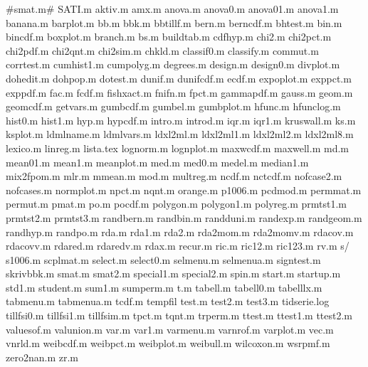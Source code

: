 #smat.m#
SATI.m
aktiv.m
amx.m
anova.m
anova0.m
anova01.m
anova1.m
banana.m
barplot.m
bb.m
bbk.m
bbtillf.m
bern.m
berncdf.m
bhtest.m
bin.m
bincdf.m
boxplot.m
branch.m
bs.m
buildtab.m
cdfhyp.m
chi2.m
chi2pct.m
chi2pdf.m
chi2qnt.m
chi2sim.m
chkld.m
classif0.m
classify.m
commut.m
corrtest.m
cumhist1.m
cumpolyg.m
degrees.m
design.m
design0.m
divplot.m
dohedit.m
dohpop.m
dotest.m
dunif.m
dunifcdf.m
ecdf.m
expoplot.m
exppct.m
exppdf.m
fac.m
fcdf.m
fishxact.m
fnifn.m
fpct.m
gammapdf.m
gauss.m
geom.m
geomcdf.m
getvars.m
gumbcdf.m
gumbel.m
gumbplot.m
hfunc.m
hfunclog.m
hist0.m
hist1.m
hyp.m
hypcdf.m
intro.m
introd.m
iqr.m
iqr1.m
kruswall.m
ks.m
ksplot.m
ldmlname.m
ldmlvars.m
ldxl2ml.m
ldxl2ml1.m
ldxl2ml2.m
ldxl2ml8.m
lexico.m
linreg.m
lista.tex
lognorm.m
lognplot.m
maxwcdf.m
maxwell.m
md.m
mean01.m
mean1.m
meanplot.m
med.m
med0.m
medel.m
median1.m
mix2fpom.m
mlr.m
mmean.m
mod.m
multreg.m
ncdf.m
nctcdf.m
nofcase2.m
nofcases.m
normplot.m
npct.m
nqnt.m
orange.m
p1006.m
pcdmod.m
permmat.m
permut.m
pmat.m
po.m
pocdf.m
polygon.m
polygon1.m
polyreg.m
prmtst1.m
prmtst2.m
prmtst3.m
randbern.m
randbin.m
randduni.m
randexp.m
randgeom.m
randhyp.m
randpo.m
rda.m
rda1.m
rda2.m
rda2mom.m
rda2momv.m
rdacov.m
rdacovv.m
rdared.m
rdaredv.m
rdax.m
recur.m
ric.m
ric12.m
ric123.m
rv.m
s/
s1006.m
scplmat.m
select.m
select0.m
selmenu.m
selmenua.m
signtest.m
skrivbbk.m
smat.m
smat2.m
special1.m
special2.m
spin.m
start.m
startup.m
std1.m
student.m
sum1.m
sumperm.m
t.m
tabell.m
tabell0.m
tabelllx.m
tabmenu.m
tabmenua.m
tcdf.m
tempfil
test.m
test2.m
test3.m
tidserie.log
tillfsi0.m
tillfsi1.m
tillfsim.m
tpct.m
tqnt.m
trperm.m
ttest.m
ttest1.m
ttest2.m
valuesof.m
valunion.m
var.m
var1.m
varmenu.m
varnrof.m
varplot.m
vec.m
vnrld.m
weibcdf.m
weibpct.m
weibplot.m
weibull.m
wilcoxon.m
wsrpmf.m
zero2nan.m
zr.m
